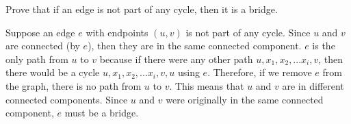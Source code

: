 \documentclass[solution, letterpaper]{cs20}
\begin{document}
Prove that if an edge is not part of any cycle, then it is a bridge.

\begin{solution}

Suppose an edge $e$ with endpoints $(u,v)$ is not part of any cycle. Since $u$ and $v$ are connected (by $e$), then they are in the same connected component. $e$ is the only path from $u$ to $v$ because if there were any other path $u, x_1, x_2, ... x_i, v$, then there would be a cycle $u, x_1, x_2, ... x_i, v, u$ using $e$. Therefore, if we remove $e$ from the graph, there is no path from $u$ to $v$. This means that $u$ and $v$ are in different connected components. Since $u$ and $v$ were originally in the same connected component, $e$ must be a bridge.

\end{solution}
\end{document}
